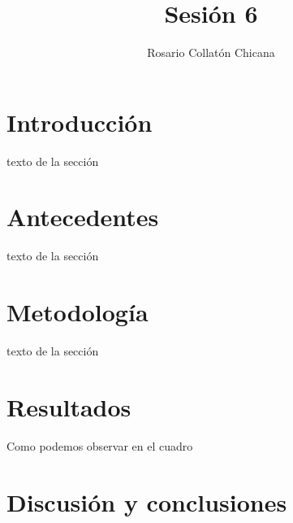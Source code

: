 \documentclass[12pt,a4paper]{article}
\author{Rosario Collatón Chicana}
\title{Sesión 6}
\begin{document}
\maketitle
\tableofcontents

\section{Introducción}
texto de la sección
\newpage

\section{Antecedentes}
texto de la sección
\newpage

\section{Metodología}
texto de la sección
\newpage

\section{Resultados}
Como podemos observar en el cuadro 

\newpage

\section{Discusión y conclusiones}
\end{document}

